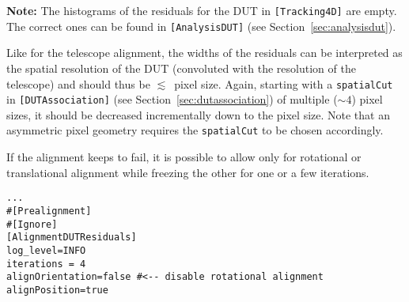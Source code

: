 \textbf{Note:} The histograms of the residuals for the DUT in \texttt{[Tracking4D]} are empty. The correct ones can be found in \texttt{[AnalysisDUT]} (see Section~\ref{sec:analysisdut}).

Like for the telescope alignment, the widths of the residuals can be interpreted as the spatial resolution of the DUT (convoluted with the resolution of the telescope) and should thus be $\lesssim$~pixel size.
Again, starting with a \texttt{spatialCut} in \texttt{[DUTAssociation]} (see Section~\ref{sec:dutassociation}) of multiple ($\sim4$) pixel sizes, it should be decreased incrementally down to the pixel size. Note that an asymmetric pixel geometry requires the \texttt{spatialCut} to be chosen accordingly.

If the alignment keeps to fail, it is possible to allow only for rotational or translational alignment while freezing the other for one or a few iterations.

\begin{verbatim}
...
#[Prealignment]
#[Ignore]
[AlignmentDUTResiduals]
log_level=INFO
iterations = 4
alignOrientation=false #<-- disable rotational alignment
alignPosition=true
\end{verbatim}
